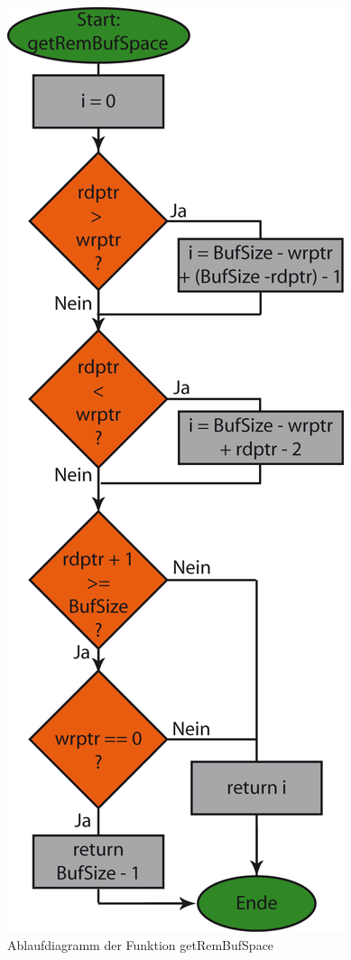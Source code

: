 \begin{figure}[h]
\includegraphics[scale = 0.8]{./getrembufspace.png}
\hspace{-14pt}
\caption{Ablaufdiagramm der Funktion getRemBufSpace}
\end{figure} 

